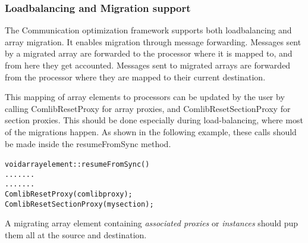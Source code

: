 



\subsubsection{Loadbalancing and Migration support}

The Communication optimization framework supports both loadbalancing and array
migration. It enables migration through message forwarding. Messages sent by a
migrated array are forwarded to the processor where it is mapped to, and from
here they get accounted. Messages sent to migrated arrays are forwarded from the
processor where they are mapped to their current destination.

This mapping of array elements to processors can be updated by the user by
calling {\textrm{ComlibResetProxy}} for array proxies, and
{\textrm{ComlibResetSectionProxy}} for section proxies. This should be done
especially during load-balancing, where most of the migrations happen. As shown
in the following example, these calls should be made inside the
{\textrm{resumeFromSync}} method.

\begin{alltt}
  void arrayelement::resumeFromSync() {
      .......
      .......
      ComlibResetProxy(comlibproxy);
      ComlibResetSectionProxy(mysection);
  }
\end{alltt}

A migrating array element containing {\em associated proxies} or {\em
instances} should pup them all at the source and destination.

